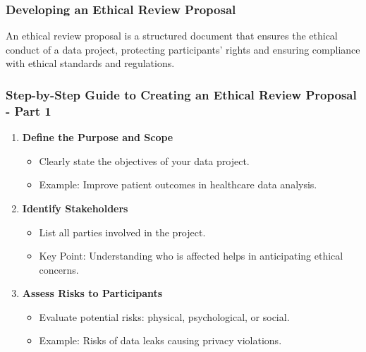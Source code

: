 \documentclass{beamer}
\begin{document}
\begin{frame}[fragile]
    \frametitle{Developing an Ethical Review Proposal}
    An ethical review proposal is a structured document that ensures the ethical conduct of a data project, protecting participants' rights and ensuring compliance with ethical standards and regulations.
\end{frame}

\begin{frame}[fragile]
    \frametitle{Step-by-Step Guide to Creating an Ethical Review Proposal - Part 1}
    \begin{enumerate}
        \item \textbf{Define the Purpose and Scope} 
        \begin{itemize}
            \item Clearly state the objectives of your data project.
            \item Example: Improve patient outcomes in healthcare data analysis.
        \end{itemize}
        
        \item \textbf{Identify Stakeholders}
        \begin{itemize}
            \item List all parties involved in the project.
            \item Key Point: Understanding who is affected helps in anticipating ethical concerns.
        \end{itemize}
        
        \item \textbf{Assess Risks to Participants}
        \begin{itemize}
            \item Evaluate potential risks: physical, psychological, or social.
            \item Example: Risks of data leaks causing privacy violations.
        \end{itemize}
    \end{enumerate}
\end{frame}
\end{document}

